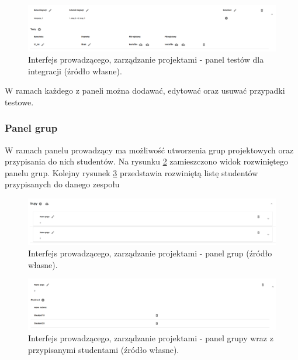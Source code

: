 \begin{figure}[h]
    \centering
    \includegraphics[width = 15cm]{chapter04/lecturer_integrations_tests.png}
    \caption{Interfejs prowadzącego, zarządzanie projektami - panel testów dla integracji (źródło własne).}
    \label{fig:lecturer_integrations_tests}
\end{figure}

W ramach każdego z paneli można dodawać, edytować oraz usuwać przypadki testowe.

\subsubsection{Panel grup}

W ramach panelu prowadzący ma możliwość utworzenia grup projektowych oraz przypisania do nich studentów.
Na rysunku \ref{fig:lecturer_groups} zamieszczono widok rozwiniętego panelu grup.
Kolejny rysunek \ref{fig:lecturer_students_in_group} przedstawia rozwiniętą listę studentów przypisanych do danego zespołu

\begin{figure}[h]
    \centering
    \includegraphics[width = 13cm]{chapter04/lecturer_groups.png}
    \caption{Interfejs prowadzącego, zarządzanie projektami - panel grup (źródło własne).}
    \label{fig:lecturer_groups}
\end{figure}

\begin{figure}[h]
    \centering
    \includegraphics[width = 13cm]{chapter04/lecturer_students_in_group.png}
    \caption{Interfejs prowadzącego, zarządzanie projektami - panel grupy wraz z przypisanymi studentami (źródło własne).}
    \label{fig:lecturer_students_in_group}
\end{figure}

